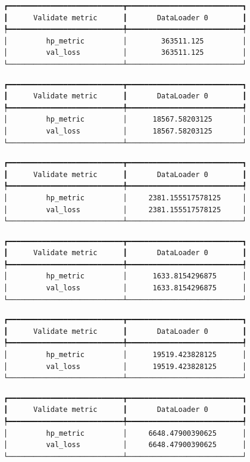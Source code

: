 \documentclass[
  letterpaper,
  DIV=11,
  numbers=noendperiod]{scrreprt}
\begin{document}
\begin{verbatim}
┏━━━━━━━━━━━━━━━━━━━━━━━━━━━┳━━━━━━━━━━━━━━━━━━━━━━━━━━━┓
┃      Validate metric      ┃       DataLoader 0        ┃
┡━━━━━━━━━━━━━━━━━━━━━━━━━━━╇━━━━━━━━━━━━━━━━━━━━━━━━━━━┩
│         hp_metric         │        363511.125         │
│         val_loss          │        363511.125         │
└───────────────────────────┴───────────────────────────┘
\end{verbatim}

\begin{verbatim}
┏━━━━━━━━━━━━━━━━━━━━━━━━━━━┳━━━━━━━━━━━━━━━━━━━━━━━━━━━┓
┃      Validate metric      ┃       DataLoader 0        ┃
┡━━━━━━━━━━━━━━━━━━━━━━━━━━━╇━━━━━━━━━━━━━━━━━━━━━━━━━━━┩
│         hp_metric         │      18567.58203125       │
│         val_loss          │      18567.58203125       │
└───────────────────────────┴───────────────────────────┘
\end{verbatim}

\begin{verbatim}
┏━━━━━━━━━━━━━━━━━━━━━━━━━━━┳━━━━━━━━━━━━━━━━━━━━━━━━━━━┓
┃      Validate metric      ┃       DataLoader 0        ┃
┡━━━━━━━━━━━━━━━━━━━━━━━━━━━╇━━━━━━━━━━━━━━━━━━━━━━━━━━━┩
│         hp_metric         │     2381.155517578125     │
│         val_loss          │     2381.155517578125     │
└───────────────────────────┴───────────────────────────┘
\end{verbatim}

\begin{verbatim}
┏━━━━━━━━━━━━━━━━━━━━━━━━━━━┳━━━━━━━━━━━━━━━━━━━━━━━━━━━┓
┃      Validate metric      ┃       DataLoader 0        ┃
┡━━━━━━━━━━━━━━━━━━━━━━━━━━━╇━━━━━━━━━━━━━━━━━━━━━━━━━━━┩
│         hp_metric         │      1633.8154296875      │
│         val_loss          │      1633.8154296875      │
└───────────────────────────┴───────────────────────────┘
\end{verbatim}

\begin{verbatim}
┏━━━━━━━━━━━━━━━━━━━━━━━━━━━┳━━━━━━━━━━━━━━━━━━━━━━━━━━━┓
┃      Validate metric      ┃       DataLoader 0        ┃
┡━━━━━━━━━━━━━━━━━━━━━━━━━━━╇━━━━━━━━━━━━━━━━━━━━━━━━━━━┩
│         hp_metric         │      19519.423828125      │
│         val_loss          │      19519.423828125      │
└───────────────────────────┴───────────────────────────┘
\end{verbatim}

\begin{verbatim}
┏━━━━━━━━━━━━━━━━━━━━━━━━━━━┳━━━━━━━━━━━━━━━━━━━━━━━━━━━┓
┃      Validate metric      ┃       DataLoader 0        ┃
┡━━━━━━━━━━━━━━━━━━━━━━━━━━━╇━━━━━━━━━━━━━━━━━━━━━━━━━━━┩
│         hp_metric         │     6648.47900390625      │
│         val_loss          │     6648.47900390625      │
└───────────────────────────┴───────────────────────────┘
\end{verbatim}
\end{document}
